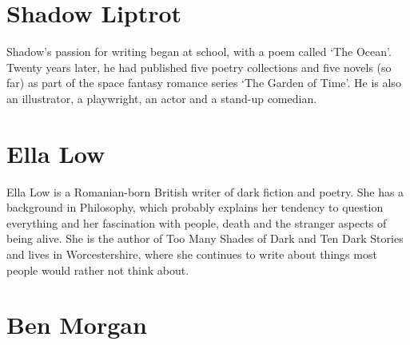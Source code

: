 
\section*{Shadow Liptrot}%

Shadow’s passion for writing began at school, with a poem called ‘The
Ocean’. Twenty years later, he had published five poetry collections
and five novels (so far) as part of the space fantasy romance series
‘The Garden of Time’. He is also an illustrator, a playwright, an
actor and a stand-up comedian.

\section*{Ella Low}%

Ella Low is a Romanian-born British writer of dark fiction and
poetry. She has a background in Philosophy, which probably explains
her tendency to question everything and her fascination with people,
death and the stranger aspects of being alive. She is the author of
Too Many Shades of Dark and Ten Dark Stories and lives in
Worcestershire, where she continues to write about things most people
would rather not think about.

% 
% 

\section*{Ben Morgan}%

